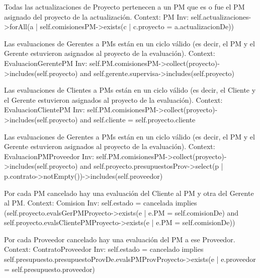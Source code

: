 \begin{listocl}
\begin{itemocl}{Todas las actualizaciones de Proyecto pertenecen a un PM que es o fue el PM asignado del proyecto de la actualización.}
Context: PM
Inv: self.actualizaciones->forAll(a | self.comisionesPM->exists(c | c.proyecto = a.actualizacionDe))
\end{itemocl}


\begin{itemocl}{Las evaluaciones de Gerentes a PMs están en un ciclo válido (es decir, el PM y el Gerente estuvieron asignados al proyecto de la evaluación).}
Context: EvaluacionGerentePM
Inv: self.PM.comisionesPM->collect(proyecto)->includes(self.proyecto) and self.gerente.supervisa->includes(self.proyecto)
\end{itemocl}

\begin{itemocl}{Las evaluaciones de Clientes a PMs están en un ciclo válido (es decir, el Cliente y el Gerente estuvieron asignados al proyecto de la evaluación).}
Context: EvaluacionClientePM
Inv: self.PM.comisionesPM->collect(proyecto)->includes(self.proyecto) and self.cliente = self.proyecto.cliente
\end{itemocl}

\begin{itemocl}{Las evaluaciones de Gerentes a PMs están en un ciclo válido (es decir, el PM y el Gerente estuvieron asignados al proyecto de la evaluación).}
Context: EvaluacionPMProveedor
Inv: self.PM.comisionesPM->collect(proyecto)->includes(self.proyecto) and self.proyecto.presupuestosProv->select(p | p.contrato->notEmpty())->includes(self.proveedor)
\end{itemocl}

\begin{itemocl}{Por cada PM cancelado hay una evaluación del Cliente al PM y otra del Gerente al PM.}
Context: Comision
Inv: self.estado = cancelada implies (self.proyecto.evalsGerPMProyecto->exists(e | e.PM = self.comisionDe) and self.proyecto.evalsClientePMProyecto->exists(e | e.PM = self.comisionDe))
\end{itemocl}

\begin{itemocl}{Por cada Proveedor cancelado hay una evaluación del PM a ese Proveedor.}
Context: ContratoProveedor
Inv: self.estado = cancelado implies self.presupuesto.presupuestoProvDe.evalsPMProvProyecto->exists(e | e.proveedor = self.presupuesto.proveedor)
\end{itemocl}


\end{listocl}
